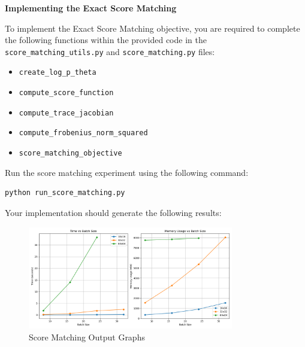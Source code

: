  \textbf{Implementing the Exact Score Matching}

To implement the Exact Score Matching objective, you are required to complete the following functions within the provided code in the \texttt{score\_matching\_utils.py} and \texttt{score\_matching.py} files:

\begin{itemize}
    \item \texttt{create\_log\_p\_theta}
    \item \texttt{compute\_score\_function}
    \item \texttt{compute\_trace\_jacobian}
    \item \texttt{compute\_frobenius\_norm\_squared}
    \item \texttt{score\_matching\_objective}
\end{itemize}

Run the score matching experiment using the following command:
\begin{lstlisting}[language=bash]
    python run_score_matching.py
\end{lstlisting}

Your implementation should generate the following results:
\begin{figure}[H]
    \centering
    \includegraphics[width=0.8\textwidth]{./figures/score_matching_results}
    \caption{Score Matching Output Graphs}
\end{figure}